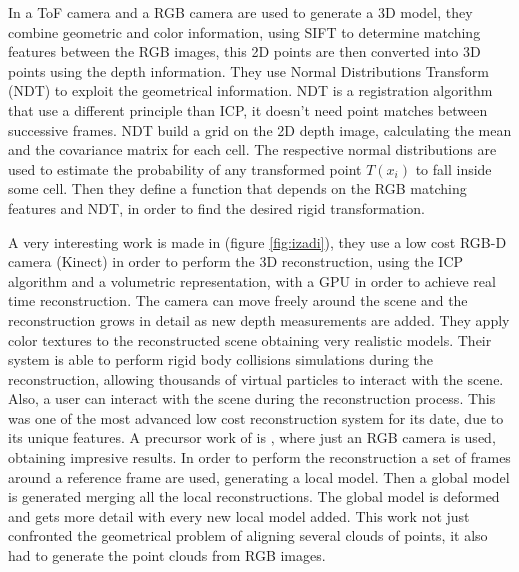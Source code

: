 In \cite{huhle} a ToF camera and a RGB camera are used to generate a 3D model, they combine geometric and color information, 
using SIFT to determine matching features between the RGB images, 
this 2D points are then converted into 3D points using the depth information. They use  Normal Distributions Transform (NDT) \cite{biber03} to exploit the geometrical 
information. NDT is a registration algorithm that use a different principle than ICP, it doesn't need point matches 
between successive frames. NDT build a grid on the 2D depth image, calculating the mean and the covariance matrix for each 
 cell. The respective normal distributions are used to estimate the probability of any transformed point $T(x_i)$ to fall 
inside some cell. Then they define a function that depends on the RGB matching features and NDT, in order to find the desired 
rigid transformation.

 
A very interesting work is made in \cite{izadi}(figure \ref{fig:izadi}), they use a low cost RGB-D camera (Kinect) in order to perform
the 3D reconstruction, using the ICP algorithm  and a volumetric representation, with a GPU in order to 
achieve real time reconstruction. The camera can move freely around the scene and the reconstruction grows in detail 
as new depth measurements are added. They apply color textures to the reconstructed scene obtaining very 
realistic models. Their system is able to perform rigid body collisions 
simulations during the reconstruction, allowing thousands of virtual particles to interact with the scene. Also, a 
user can interact with the scene during the reconstruction process. This was one of the most advanced low cost 
reconstruction system for its date, due to its unique features. A precursor work of \cite{izadi} is \cite{Newcombe10livedense}, where 
 just an RGB camera is used, obtaining impresive results. In order to perform the reconstruction a set of frames around 
a reference frame are used, generating a local model. Then a global model is generated merging all the local reconstructions.
The global model is deformed and gets more detail with every new local model added. This work not just confronted 
the geometrical problem of aligning several clouds of points, it also had to generate the point clouds from RGB images.

